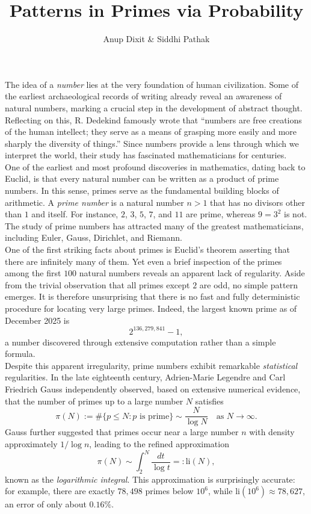 \documentclass[11pt, reqno]{article}
\title{Patterns in Primes via Probability}
\author{Anup Dixit \& Siddhi Pathak}
\date{ }
\begin{document}
\maketitle



The idea of a \emph{number} lies at the very foundation of human civilization. Some of the earliest archaeological records of writing already reveal an awareness of natural numbers, marking a crucial step in the development of abstract thought. Reflecting on this, R. Dedekind famously wrote that ``numbers are free creations of the human intellect; they serve as a means of grasping more easily and more sharply the diversity of things.'' Since numbers provide a lens through which we interpret the world, their study has fascinated mathematicians for centuries. \\

One of the earliest and most profound discoveries in mathematics, dating back to Euclid, is that every natural number can be written as a product of prime numbers. In this sense, primes serve as the fundamental building blocks of arithmetic. A \emph{prime number} is a natural number $n>1$ that has no divisors other than $1$ and itself. For instance, $2$, $3$, $5$, $7$, and $11$ are prime, whereas $9=3^2$ is not. The study of prime numbers has attracted many of the greatest mathematicians, including Euler, Gauss, Dirichlet, and Riemann. \\

One of the first striking facts about primes is Euclid’s theorem asserting that there are infinitely many of them. Yet even a brief inspection of the primes among the first $100$ natural numbers reveals an apparent lack of regularity. Aside from the trivial observation that all primes except $2$ are odd, no simple pattern emerges. It is therefore unsurprising that there is no fast and fully deterministic procedure for locating very large primes. Indeed, the largest known prime as of December 2025 is
\[
2^{136{,}279{,}841}-1,
\]
a number discovered through extensive computation rather than a simple formula. \\

Despite this apparent irregularity, prime numbers exhibit remarkable \emph{statistical} regularities. In the late eighteenth century, Adrien-Marie Legendre and Carl Friedrich Gauss independently observed, based on extensive numerical evidence, that the number of primes up to a large number $N$ satisfies
\[
\pi(N) := \#\{ p \le N : p \text{ is prime} \} \sim \frac{N}{\log N}
\quad \text{as } N \to \infty.
\]
Gauss further suggested that primes occur near a large number $n$ with density approximately $1/\log n$, leading to the refined approximation
\[
\pi(N) \sim \int_2^N \frac{dt}{\log t} =: \mathrm{li}(N),
\]
known as the \emph{logarithmic integral}. This approximation is surprisingly accurate: for example, there are exactly $78{,}498$ primes below $10^6$, while $\mathrm{li}(10^6) \approx 78{,}627$, an error of only about $0.16\%$. \\
\end{document}
